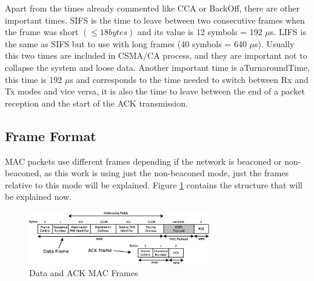 Apart from the times already commented like \ac{CCA} or BackOff, there are other important times. \ac{SIFS} is the time to leave between two 
consecutive frames when the frame was short $(\le 18 bytes)$ and its value is 12 symbols = 192 $\mu$s. \ac{LIFS} is the same as \ac{SIFS} but
to use with long frames (40 symbols = 640 $\mu$s). Usually this two times are included in \ac{CSMA/CA} process, and they are important not to
collapse the system and loose data. Another important time is 
aTurnaroundTime, this time is 192 $\mu$s and corresponds to the time needed to switch between \ac{Rx} and \ac{Tx} modes and vice versa, it is
also the time to leave between the end of a packet reception and the start of the \ac{ACK} transmission.

\subsection{Frame Format}

\ac{MAC} packets use different frames depending if the network is beaconed or non-beaconed, as this work is using just the non-beaconed mode,
just the frames relative to this mode will be explained. Figure \ref{fig:MACFrame} contains the structure that will be explained now.

\begin{figure}[!ht]
 \begin{center}
  \includegraphics[width=0.7\textwidth]{MACFrame.eps}
 \end{center}
 \caption{Data and \ac{ACK} \ac{MAC} Frames \cite{IEEE802.15.4-2006}}
 \label{fig:MACFrame}
\end{figure}

